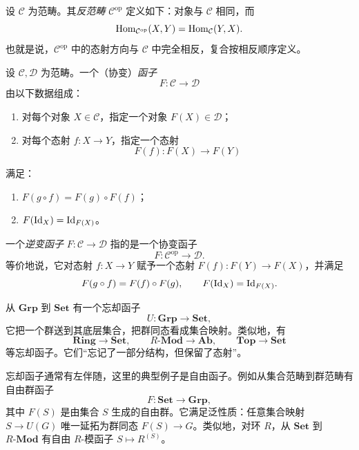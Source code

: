 \begin{definition}
设 $\mathcal C$ 为范畴。其\emph{反范畴} $\mathcal C^{\mathrm{op}}$ 定义如下：对象与 $\mathcal C$ 相同，而
\[
  \mathrm{Hom}_{\mathcal C^{\mathrm{op}}}(X,Y)
  =
  \mathrm{Hom}_{\mathcal C}(Y,X).
\]
也就是说，$\mathcal C^{\mathrm{op}}$ 中的态射方向与 $\mathcal C$ 中完全相反，复合按相反顺序定义。
\end{definition}

\begin{definition}
设 $\mathcal C,\mathcal D$ 为范畴。一个（协变）\emph{函子}
\[
  F\colon \mathcal C\longrightarrow \mathcal D
\]
由以下数据组成：
\begin{enumerate}[label=(\arabic*), leftmargin=2.5em]
  \item 对每个对象 $X\in \mathcal C$，指定一个对象 $F(X)\in \mathcal D$；
  \item 对每个态射 $f\colon X\to Y$，指定一个态射
  \[
    F(f)\colon F(X)\to F(Y)
  \]
\end{enumerate}
满足：
\begin{enumerate}[label=(\roman*), leftmargin=2.5em]
  \item $F(g\circ f)=F(g)\circ F(f)$；
  \item $F(\mathrm{Id}_X)=\mathrm{Id}_{F(X)}$。
\end{enumerate}

一个\emph{逆变函子} $F\colon \mathcal C\to \mathcal D$ 指的是一个协变函子
\[
  F\colon \mathcal C^{\mathrm{op}}\longrightarrow \mathcal D.
\]
等价地说，它对态射 $f\colon X\to Y$ 赋予一个态射 $F(f)\colon F(Y)\to F(X)$，并满足
\[
  F(g\circ f)=F(f)\circ F(g),
  \qquad
  F(\mathrm{Id}_X)=\mathrm{Id}_{F(X)}.
\]
\end{definition}

\begin{example}[忘却函子]
从 $\mathbf{Grp}$ 到 $\mathbf{Set}$ 有一个忘却函子
\[
  U\colon \mathbf{Grp}\to \mathbf{Set},
\]
它把一个群送到其底层集合，把群同态看成集合映射。类似地，有
\[
  \mathbf{Ring}\to \mathbf{Set},
  \qquad
  R\text{-}\mathbf{Mod}\to \mathbf{Ab},
  \qquad
  \mathbf{Top}\to \mathbf{Set}
\]
等忘却函子。它们“忘记了一部分结构，但保留了态射”。
\end{example}

\begin{example}[自由函子]
忘却函子通常有左伴随，这里的典型例子是自由函子。例如从集合范畴到群范畴有自由群函子
\[
  F\colon \mathbf{Set}\to \mathbf{Grp},
\]
其中 $F(S)$ 是由集合 $S$ 生成的自由群。它满足泛性质：任意集合映射 $S\to U(G)$ 唯一延拓为群同态 $F(S)\to G$。类似地，对环 $R$，从 $\mathbf{Set}$ 到 $R\text{-}\mathbf{Mod}$ 有自由 $R$-模函子 $S\mapsto R^{(S)}$。
\end{example}

